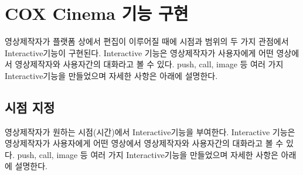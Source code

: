 \documentclass[chapter,oneside]{oblivoir}
\begin{document}
\section{ COX Cinema 기능 구현}
영상제작자가 플랫폼 상에서 편집이 이루어질 때에 시점과 범위의 두 가지 관점에서 Interactive기능이 구현된다. Interactive 기능은 영상제작자가 사용자에게 어떤 영상에서 영상제작자와 사용자간의 대화라고 볼 수 있다. push, call, image 등 여러 가지 Interactive기능을 만들었으며 자세한 사항은 아래에 설명한다.  

\subsection{시점 지정}

영상제작자가 원하는 시점(시간)에서 Interactive기능을 부여한다. Interactive 기능은 영상제작자가 사용자에게 어떤 영상에서 영상제작자와 사용자간의 대화라고 볼 수 있다. push, call, image 등 여러 가지 Interactive기능을 만들었으며 자세한 사항은 아래에 설명한다.  
\end{document}
